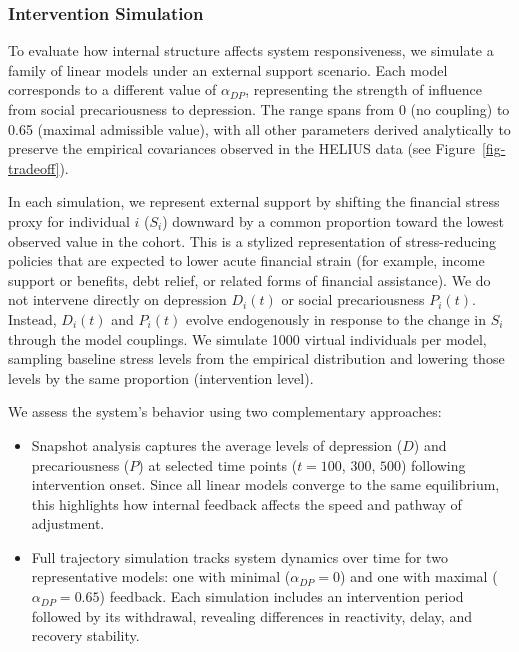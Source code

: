 \documentclass[
]{article}
\begin{document}
\subsubsection{Intervention Simulation}\label{intervention-simulation}

To evaluate how internal structure affects system responsiveness, we
simulate a family of linear models under an external support scenario.
Each model corresponds to a different value of \(\alpha_{DP}\),
representing the strength of influence from social precariousness to
depression. The range spans from 0 (no coupling) to 0.65 (maximal
admissible value), with all other parameters derived analytically to
preserve the empirical covariances observed in the HELIUS data (see
Figure~\ref{fig-tradeoff}).

In each simulation, we represent external support by shifting the
financial stress proxy for individual \(i\) (\(S_i\)) downward by a
common proportion toward the lowest observed value in the cohort. This
is a stylized representation of stress-reducing policies that are
expected to lower acute financial strain (for example, income support or
benefits, debt relief, or related forms of financial assistance). We do
not intervene directly on depression \(D_i(t)\) or social precariousness
\(P_i(t)\). Instead, \(D_i(t)\) and \(P_i(t)\) evolve endogenously in
response to the change in \(S_i\) through the model couplings. We
simulate 1000 virtual individuals per model, sampling baseline stress
levels from the empirical distribution and lowering those levels by the
same proportion (intervention level).

We assess the system's behavior using two complementary approaches:

\begin{itemize}
\item
  Snapshot analysis captures the average levels of depression (\(D\))
  and precariousness (\(P\)) at selected time points (\(t = 100\),
  \(300\), \(500\)) following intervention onset. Since all linear
  models converge to the same equilibrium, this highlights how internal
  feedback affects the speed and pathway of adjustment.
\item
  Full trajectory simulation tracks system dynamics over time for two
  representative models: one with minimal (\(\alpha_{DP} = 0\)) and one
  with maximal (\(\alpha_{DP} = 0.65\)) feedback. Each simulation
  includes an intervention period followed by its withdrawal, revealing
  differences in reactivity, delay, and recovery stability.
\end{itemize}
\end{document}
